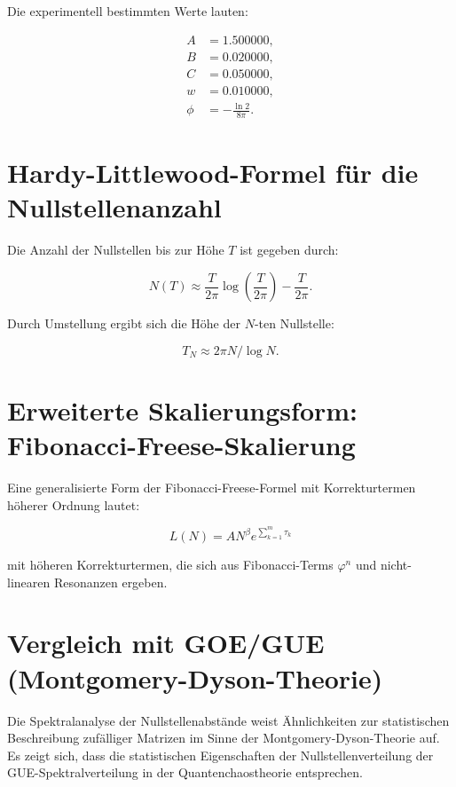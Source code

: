 \documentclass[a4paper,12pt]{article}
\begin{document}
Die experimentell bestimmten Werte lauten:

\begin{align*}
A &= 1.500000, \\
B &= 0.020000, \\
C &= 0.050000, \\
w &= 0.010000, \\
\phi &= -\frac{\ln 2}{8\pi}.
\end{align*}

\section{Hardy-Littlewood-Formel für die Nullstellenanzahl}
Die Anzahl der Nullstellen bis zur Höhe \( T \) ist gegeben durch:

\begin{equation}
N(T) \approx \frac{T}{2\pi} \log \left( \frac{T}{2\pi} \right) - \frac{T}{2\pi}.
\end{equation}

Durch Umstellung ergibt sich die Höhe der \( N \)-ten Nullstelle:

\begin{equation}
T_N \approx 2\pi N / \log N.
\end{equation}

\section{Erweiterte Skalierungsform: Fibonacci-Freese-Skalierung}
Eine generalisierte Form der Fibonacci-Freese-Formel mit Korrekturtermen höherer Ordnung lautet:

\begin{equation}
L(N) = A N^\beta e^{\sum_{k=1}^{m} \tau_k}
\end{equation}

mit höheren Korrekturtermen, die sich aus Fibonacci-Terms \(\varphi^n\) und nicht-linearen Resonanzen ergeben.

\section{Vergleich mit GOE/GUE (Montgomery-Dyson-Theorie)}
Die Spektralanalyse der Nullstellenabstände weist Ähnlichkeiten zur statistischen Beschreibung zufälliger Matrizen im Sinne der Montgomery-Dyson-Theorie auf. Es zeigt sich, dass die statistischen Eigenschaften der Nullstellenverteilung der GUE-Spektralverteilung in der Quantenchaostheorie entsprechen.
\end{document}

